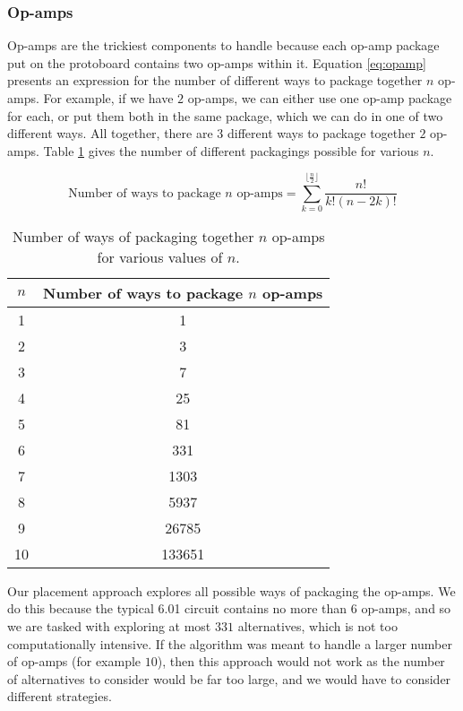 \subsubsection{Op-amps}

Op-amps are the trickiest components to handle because each op-amp package put
on the protoboard contains two op-amps within it. Equation
\ref{eq:opamp} presents an expression for the number of
different ways to package together $n$ op-amps. For example, if we have $2$
op-amps, we can either use one op-amp package for each, or put them both in the
same package, which we can do in one of two different ways. All together, there
are $3$ different ways to package together $2$ op-amps.
Table \ref{tb:opamp} gives the number of different packagings possible for
various $n$.

\begin{equation}
\text{Number of ways to package $n$ op-amps} =
\sum\limits_{k=0}^{\lfloor\frac{n}{2}\rfloor}{\frac{n!}{k!(n - 2k)!}}
\label{eq:opamp}
\end{equation}

\begin{table}
\begin{center}
\begin{singlespace}
\begin{tabular}{c | c}
$n$ & Number of ways to package $n$ op-amps \\
\hline
\hline
1 & 1 \\
2 & 3 \\
3 & 7 \\
4 & 25 \\
5 & 81 \\
6 & 331 \\
7 & 1303 \\
8 & 5937 \\
9 & 26785 \\
10 & 133651
\end{tabular}
\end{singlespace}
\end{center}
\label{tb:opamp}
\caption{Number of ways of packaging together $n$ op-amps for various values of
$n$.}
\end{table}

Our placement approach explores all possible ways
of packaging the op-amps. We do this because the typical 6.01 circuit contains
no more than $6$ op-amps, and so we are tasked with exploring at most $331$
alternatives, which is not too computationally intensive. If the
algorithm was meant to handle a larger number of op-amps (for example $10$), then
this approach would not work as the number of alternatives to consider would be
far too large, and we would have to consider different strategies.

